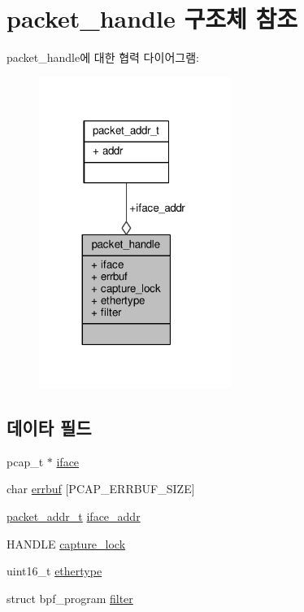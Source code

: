 \hypertarget{structpacket__handle}{}\section{packet\+\_\+handle 구조체 참조}
\label{structpacket__handle}


packet\+\_\+handle에 대한 협력 다이어그램\+:
\nopagebreak
\begin{figure}[H]
\begin{center}
\leavevmode
\includegraphics[width=176pt]{structpacket__handle__coll__graph}
\end{center}
\end{figure}
\subsection*{데이타 필드}
\begin{DoxyCompactItemize}
\item 
pcap\+\_\+t $\ast$ \hyperlink{structpacket__handle_ac520eed8a1cbae3624457d41e5407f1d}{iface}
\item 
char \hyperlink{structpacket__handle_a41891cad090df07cd9360f1d8a9f1396}{errbuf} \mbox{[}P\+C\+A\+P\+\_\+\+E\+R\+R\+B\+U\+F\+\_\+\+S\+I\+ZE\mbox{]}
\item 
\hyperlink{structpacket__addr__t}{packet\+\_\+addr\+\_\+t} \hyperlink{structpacket__handle_a1f4b910af694f84948acbe7e6008f524}{iface\+\_\+addr}
\item 
H\+A\+N\+D\+LE \hyperlink{structpacket__handle_a010ab438d7d926a405d3e65b0f36923a}{capture\+\_\+lock}
\item 
uint16\+\_\+t \hyperlink{structpacket__handle_aa9296c58dc24c63c4ee927db394a97d7}{ethertype}
\item 
struct bpf\+\_\+program \hyperlink{structpacket__handle_a4e4620e4c59a458d81a0a62a78d7c712}{filter}
\end{DoxyCompactItemize}


